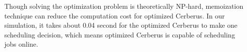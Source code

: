 
Though solving the optimization problem is theoretically NP-hard, 
memoization technique can reduce the computation cost for optimized Cerberus.
In our simulation, it takes about 0.04 second for the optimized 
Cerberus to make one scheduling decision, which means optimized Cerberus 
is capable of scheduling jobs online.  



